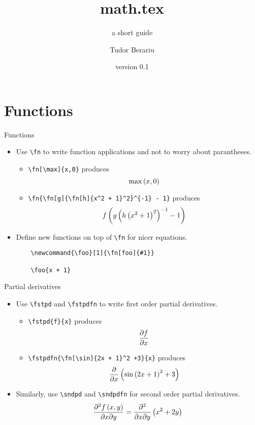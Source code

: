 \documentclass{beamer}
\title{math.tex}
\subtitle{a short guide}
\author{Tudor Berariu}
\date{version 0.1}
\begin{document}
\frame[plain]{\titlepage}

\section{Functions}

\begin{frame}[fragile]{Functions}
        \begin{itemize}
            \item Use \verb!\fn! to write \alert{function applications} and not to worry about parantheses.
            \begin{itemize}
                \item \verb!\fn[\max]{x,0}! produces $$\fn[\max]{x, 0}$$
                \item \verb!\fn{\fn[g]{\fn[h]{x^2 + 1}^2}^{-1} - 1}! produces
                  $$\fn[f]{\fn[g]{\fn[h]{x^2 + 1}^2}^{-1} - 1}$$
                \end{itemize}
            \item Define new functions on top of \verb!\fn! for nicer equations.
        \begin{verbatim}
    \newcommand{\foo}[1]{\fn[foo]{#1}}

    \foo{x + 1}
            \end{verbatim}
        \end{itemize}
    \end{frame}
    
    \begin{frame}[fragile]{Partial derivatives}
        \begin{itemize}
            \item Use \verb!\fstpd! and \verb!\fstpdfn! to write \alert{first order partial derivatives}.
                \begin{itemize}
                    \item \verb!\fstpd{f}{x}! produces $$\fstpd{f}{x}$$
                    \item \verb!\fstpdfn{\fn[\sin]{2x + 1}^2 +3}{x}! produces
                     $$\fstpdfn{\fn[\sin]{2x + 1}^2 +3}{x}$$
                \end{itemize}
            \item Similarly, use \verb!\sndpd! and \verb!\sndpdfn! for
             \alert{second order partial derivatives}.
                $$\sndpd{\fn{x, y}}{x}{y} = \sndpdfn{x^2 + 2y}{x}{y}$$
        \end{itemize}        
    \end{frame}
\end{document}
